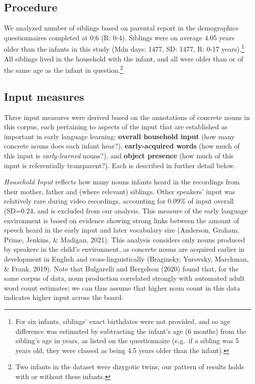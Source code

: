 \documentclass[
  english,
  man,floatsintext]{apa6}
\begin{document}
\hypertarget{procedure}{%
\subsection{Procedure}\label{procedure}}

We analyzed number of siblings based on parental report in the demographics questionnaires completed at 0;6 (R: 0-4). Siblings were on average 4.05 years older than the infants in this study (Mdn days: 1477, SD: 1477, R: 0-17 years).\footnote{For six infants, siblings' exact birthdates were not provided, and so age difference was estimated by subtracting the infant's age (6 months) from the sibling's age in years, as listed on the questionnaire (e.g.~if a sibling was 5 years old, they were classed as being 4.5 years older than the infant).} All siblings lived in the household with the infant, and all were older than or of the same age as the infant in question.\footnote{Two infants in the dataset were dizygotic twins; our pattern of results holds with or without these infants.}

\hypertarget{input-measures}{%
\subsection{Input measures}\label{input-measures}}

Three input measures were derived based on the annotations of concrete nouns in this corpus, each pertaining to aspects of the input that are established as important in early language learning: \textbf{overall household input} (how many concrete nouns does each infant hear?), \textbf{early-acquired words} (how much of this input is \emph{early-learned} nouns?), and \textbf{object presence} (how much of this input is referentially transparent?). Each is described in further detail below.

\emph{Household Input} reflects how many nouns infants heard in the recordings from their mother, father and (where relevant) siblings. Other speakers' input was relatively rare during video recordings, accounting for 0.09\% of input overall (SD=0.24, and is excluded from our analysis. This measure of the early language environment is based on evidence showing strong links between the amount of speech heard in the early input and later vocabulary size (Anderson, Graham, Prime, Jenkins, \& Madigan, 2021). This analysis considers only nouns produced by speakers in the child's environment, as concrete nouns are acquired earlier in development in English and cross-linguistically (Braginsky, Yurovsky, Marchman, \& Frank, 2019). Note that Bulgarelli and Bergelson (2020) found that, for the same corpus of data, noun production correlated strongly with automated adult word count estimates; we can thus assume that higher noun count in this data indicates higher input across the board.
\end{document}
